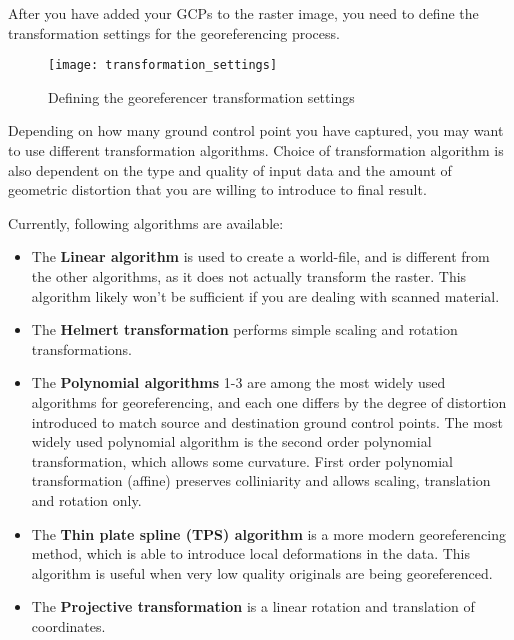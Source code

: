 \label{georeferencer_transformation}

After you have added your GCPs to the raster image, you need to define the 
transformation settings for the georeferencing process. 

\begin{figure}[ht]
\centering
  \texttt{[image: transformation\_settings]}
  \caption{Defining the georeferencer transformation settings \nixcaption}\label{fig:georef_transform}
\end{figure}


Depending on how many ground control point you have captured, you may want 
to use different transformation algorithms. Choice of transformation 
algorithm is also dependent on the type and quality of input data and 
the amount of geometric distortion that you are willing to introduce 
to final result.

Currently, following algorithms are available: 

\begin{itemize}[label=--]
\item The \textbf{Linear algorithm} is used to create a world-file, and is different 
from the other algorithms, as it does not actually transform the raster. 
This algorithm likely won't be sufficient if you are dealing with scanned 
material.
\item The \textbf{Helmert transformation} performs simple scaling and rotation 
transformations. 
\item The \textbf{Polynomial algorithms} 1-3 are among the most widely 
used algorithms 
for georeferencing, and each one differs by the degree of distortion 
introduced to match source and destination ground control points. The 
most widely used polynomial algorithm is the second order polynomial 
transformation, which allows some curvature. First order polynomial 
transformation (affine) preserves colliniarity and allows scaling, 
translation and rotation only.
\item The \textbf{Thin plate spline (TPS) algorithm} is a more 
modern georeferencing  method, which is able to introduce local 
deformations in the data. This algorithm is useful when very low 
quality originals are being georeferenced.
\item The \textbf{Projective transformation} is a linear rotation and 
translation of coordinates.
\end{itemize}

